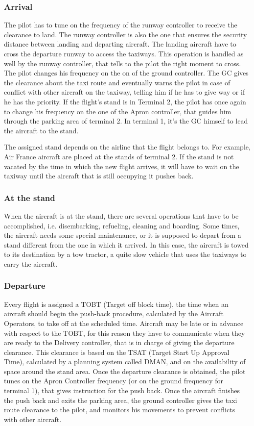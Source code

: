 \documentclass{article}
\begin{document}
\subsubsection*{Arrival} 
The pilot has to tune on the frequency of the runway controller to receive the clearance to land. The runway controller is also the one that ensures the security distance between landing and departing aircraft. The landing aircraft have to cross the departure runway to access the taxiways. This operation is handled as well by the runway controller, that tells to the pilot the right moment to cross.
The pilot changes his frequency on the on of the ground controller. The GC gives the clearance about the taxi route and eventually warns the pilot in case of conflict with other aircraft on the taxiway, telling him if he has to give way or if he has the priority.
If the flight's stand is in Terminal 2, the pilot has once again to change his frequency on the one of the Apron controller, that guides him through the parking area of terminal 2. In terminal 1, it's the GC himself to lead the aircraft to the stand.

The assigned stand depends on the airline that the flight belongs to. For example, Air France aircraft are placed at the stands of terminal 2.
If the stand is not vacated by the time in which the new flight arrives, it will have to wait on the taxiway until the aircraft that is still occupying it pushes back.

\subsubsection*{At the stand} 
When the aircraft is at the stand, there are several operations that have to be accomplished, i.e. disembarking, refueling, cleaning and boarding.
Some times, the aircraft needs some special maintenance, or it is supposed to depart from a stand different from the one in which it arrived. In this case, the aircraft is towed to its destination by a tow tractor, a quite slow vehicle that uses the taxiways to carry the aircraft. 

\subsubsection*{Departure} 
Every flight is assigned a TOBT (Target off block time), the time when an aircraft should begin the push-back procedure, calculated by the Aircraft Operators, to take off at the scheduled time.
Aircraft may be late or in advance with respect to the TOBT, for this reason they have to communicate when they are ready to the Delivery controller, that is in charge of giving the departure clearance. This clearance is based on the TSAT (Target Start Up Approval Time), calculated by a planning system called DMAN, and on the availability of space around the stand area.
Once the departure clearance is obtained, the pilot tunes on the Apron Controller frequency (or on the ground frequency for terminal 1), that gives instruction for the push back. Once the aircraft finishes the push back and exits the parking area, the ground controller gives the taxi route clearance to the pilot, and monitors his movements to prevent conflicts with other aircraft. 
\end{document}
